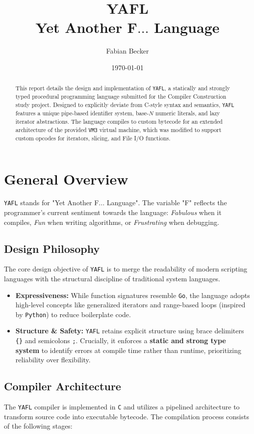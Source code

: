 \documentclass[11pt,a4paper]{article}
\title{\textbf{YAFL} \\ Yet Another F$\dots$ Language}
\author{Fabian Becker}
\date{\today}
\begin{document}
\maketitle

\begin{abstract}
This report details the design and implementation of \texttt{YAFL}, a statically and strongly typed procedural programming language submitted for the Compiler Construction study project.
Designed to explicitly deviate from C-style syntax and semantics, \texttt{YAFL} features a unique pipe-based identifier system, base-$N$ numeric literals, and lazy iterator abstractions.
The language compiles to custom bytecode for an extended architecture of the provided \texttt{VM3} virtual machine, which was modified to support custom opcodes for iterators, slicing, and File I/O functions.
\end{abstract}

\section{General Overview}

\texttt{YAFL} stands for "Yet Another F... Language". The variable "F" reflects the programmer's current sentiment towards the language: \textit{Fabulous} when it compiles, \textit{Fun} when writing algorithms, or \textit{Frustrating} when debugging.

\subsection{Design Philosophy}
The core design objective of \texttt{YAFL} is to merge the readability of modern scripting languages with the structural discipline of traditional system languages.
\begin{itemize}
    \item \textbf{Expressiveness:} While function signatures resemble \texttt{Go}, the language adopts high-level concepts like generalized iterators and range-based loops (inspired by \texttt{Python}) to reduce boilerplate code.
    \item \textbf{Structure \& Safety:} \texttt{YAFL} retains explicit structure using brace delimiters \texttt{\{\}} and semicolons \texttt{;}. Crucially, it enforces a \textbf{static and strong type system} to identify errors at compile time rather than runtime, prioritizing reliability over flexibility.
\end{itemize}

\subsection{Compiler Architecture}
The \texttt{YAFL}  compiler is implemented in \texttt{C} and utilizes a pipelined architecture to transform source code into executable bytecode. The compilation process consists of the following stages:
\end{document}
